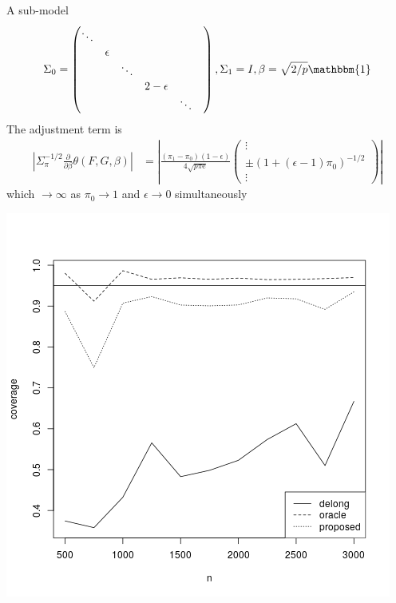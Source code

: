 \documentclass{beamer}
\DeclareMathOperator*{\diag}{diag}
\newcommand{\F}{F}
\newcommand{\G}{G}
\newcommand{\auc}{\theta}
\begin{document}
\begin{frame}
  A sub-model
  \begin{align}
    \Sigma_0=\begin{pmatrix}
      \ddots & & & &\\
      & \epsilon & & & &\\
      & & \ddots & & &\\
      & &  & 2-\epsilon& &\\
      & &  & & \ddots&
    \end{pmatrix},
    \Sigma_1=I,
    \beta=\sqrt{2/p}\mathbbm{1}
  \end{align}
The adjustment term is
  \begin{align}
    |\Sigma_{\pi}^{-1/2}\frac{\partial}{\partial\beta}\auc(\F,\G,\beta)|
    &= \left|\frac{(\pi_1-\pi_0)(1-\epsilon)}{4\sqrt{p\pi\text{e}}}
      \begin{pmatrix}
        \vdots\\
        \pm( 1+(\epsilon-1)\pi_0)^{-1/2}\\
        \vdots        
      \end{pmatrix}\right|
  \end{align}
  which $\to\infty$ as $\pi_0\to 1$ and  $\epsilon\to 0$ simultaneously
\end{frame}

\begin{frame}
\includegraphics[scale=.5]{../sim/lda/sim}
\end{frame}
\end{document}
